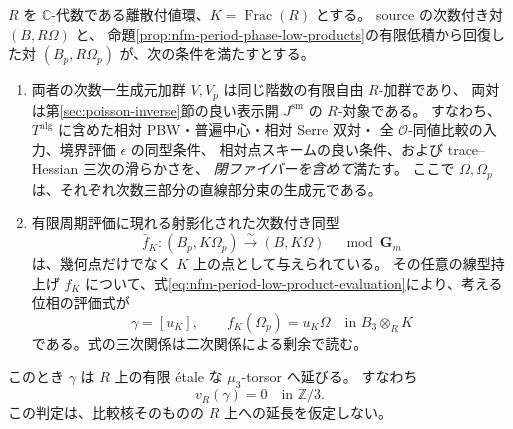 \begin{lemma}
\label{lem:nfm-period-integral-presentation-unramified}
$R$ を $\mathbb C$-代数である離散付値環、$K=\operatorname{Frac}(R)$ とする。
source の次数付き対 $(B,R\Omega)$ と、
命題\ref{prop:nfm-period-phase-low-products}の有限低積から回復した対
$(B_p,R\Omega_p)$ が、次の条件を満たすとする。
\begin{enumerate}
\item 両者の次数一生成元加群 $V,V_p$ は同じ階数の有限自由 $R$-加群であり、
両対は第\ref{sec:poisson-inverse}節の良い表示開 $J^{\mathrm{sm}}$ の $R$-対象である。
すなわち、$T^{\mathrm{alg}}$ に含めた相対 PBW・普遍中心・相対 Serre 双対・
全 $\mathcal O$-同値比較の入力、境界評価 $\epsilon$ の同型条件、
相対点スキームの良い条件、および trace--Hessian 三次の滑らかさを、
\emph{閉ファイバーを含めて}満たす。
ここで $\Omega,\Omega_p$ は、それぞれ次数三部分の直線部分束の生成元である。
\item 有限周期評価に現れる射影化された次数付き同型
\[
 \bar f_K:(B_p,K\Omega_p)\xrightarrow{\sim}(B,K\Omega)
       \quad\bmod\mathbf G_m
\]
は、幾何点だけでなく $K$ 上の点として与えられている。
その任意の線型持上げ $f_K$ について、式\eqref{eq:nfm-period-low-product-evaluation}により、考える位相の評価式が
\[
 \gamma=[u_K],\qquad
 f_K(\Omega_p)=u_K\Omega
       \quad\text{in }B_3\otimes_RK
\]
である。式の三次関係は二次関係による剰余で読む。
\end{enumerate}
このとき $\gamma$ は $R$ 上の有限 \'etale な $\mu_3$-torsor へ延びる。
すなわち
\[
 v_R(\gamma)=0\quad\text{in }\mathbb Z/3.
\]
この判定は、比較核そのものの $R$ 上への延長を仮定しない。
\end{lemma}

